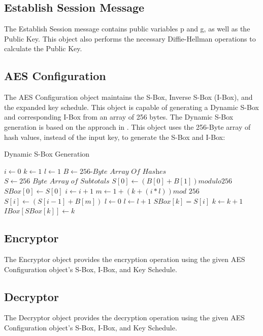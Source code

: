 \documentclass[journal]{IEEEtran}
\begin{document}
\subsection{Establish Session Message}
The Establish Session message contains public variables p and g, as well as the Public Key. This object also performs the necessary Diffie-Hellman operations to calculate the Public Key.

\subsection{AES Configuration}
The AES Configuration object maintains the S-Box, Inverse S-Box (I-Box), and the expanded key schedule. This object is capable of generating a Dynamic S-Box and corresponding I-Box from an array of 256 bytes. The Dynamic S-Box generation is based on the approach in \cite{AESKeySBox}. This object uses the 256-Byte array of hash values, instead of the input key, to generate the S-Box and I-Box:
\begin{algorithm}
	\caption{Dynamic S-Box Generation}\label{euclid}
	\begin{algorithmic}[1]
		\State $i \gets 0$
		\State $k \gets 1$
		\State $l \gets 1$
		\State $B \gets \textit{256-Byte Array Of Hashes}$
		\State $S \gets \textit{256 Byte Array of Subtotals}$
		\State $S[0] \gets (B[0]+B[1]) modulo 256$
		\State $SBox[0] \gets S[0]$
			\State $i \gets i + 1$
			\State $m \gets 1 + (k+(i*l)) \textit{mod 256}$
			\State $S[i] \gets (S[i-1]+B[m])$
			\State $l \gets 0$
					\State $l \gets l + 1$
				\EndIf	
			\EndFor
				\State $SBox[k]=S[i]$
				\State $k \gets k+1$
			\EndIf	
		\EndWhile
			\State $IBox[SBox[k]] \gets k$
		\EndFor
		\EndProcedure
	\end{algorithmic}
\end{algorithm} 

\subsection{Encryptor}
The Encryptor object provides the encryption operation using the given AES Configuration object's S-Box, I-Box, and Key Schedule.

\subsection{Decryptor}
The Decryptor object provides the decryption operation using the given AES Configuration object's S-Box, I-Box, and Key Schedule.
\end{document}
